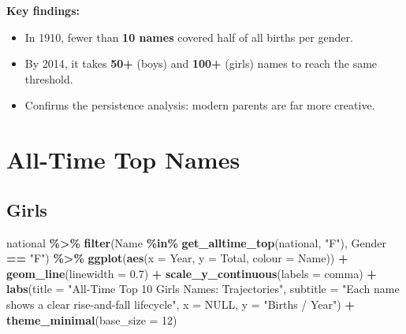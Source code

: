 \documentclass[
]{article}
\newenvironment{Shaded}{\begin{snugshade}}{\end{snugshade}}
\newcommand{\AttributeTok}[1]{\textcolor[rgb]{0.13,0.29,0.53}{#1}}
\newcommand{\ConstantTok}[1]{\textcolor[rgb]{0.56,0.35,0.01}{#1}}
\newcommand{\DecValTok}[1]{\textcolor[rgb]{0.00,0.00,0.81}{#1}}
\newcommand{\FloatTok}[1]{\textcolor[rgb]{0.00,0.00,0.81}{#1}}
\newcommand{\FunctionTok}[1]{\textcolor[rgb]{0.13,0.29,0.53}{\textbf{#1}}}
\newcommand{\NormalTok}[1]{#1}
\newcommand{\SpecialCharTok}[1]{\textcolor[rgb]{0.81,0.36,0.00}{\textbf{#1}}}
\newcommand{\StringTok}[1]{\textcolor[rgb]{0.31,0.60,0.02}{#1}}
\providecommand{\tightlist}{%
  \setlength{\itemsep}{0pt}\setlength{\parskip}{0pt}}
\begin{document}
\textbf{Key findings:}

\begin{itemize}
\tightlist
\item
  In 1910, fewer than \textbf{10 names} covered half of all births per
  gender.
\item
  By 2014, it takes \textbf{50+} (boys) and \textbf{100+} (girls) names
  to reach the same threshold.
\item
  Confirms the persistence analysis: modern parents are far more
  creative.
\end{itemize}

\newpage

\section{All-Time Top Names}\label{all-time-top-names}

\subsection{Girls}\label{girls-1}

\begin{Shaded}
\begin{Highlighting}[]
\NormalTok{national }\SpecialCharTok{\%\textgreater{}\%}
    \FunctionTok{filter}\NormalTok{(Name }\SpecialCharTok{\%in\%} \FunctionTok{get\_alltime\_top}\NormalTok{(national, }\StringTok{"F"}\NormalTok{), Gender }\SpecialCharTok{==} \StringTok{"F"}\NormalTok{) }\SpecialCharTok{\%\textgreater{}\%}
    \FunctionTok{ggplot}\NormalTok{(}\FunctionTok{aes}\NormalTok{(}\AttributeTok{x =}\NormalTok{ Year, }\AttributeTok{y =}\NormalTok{ Total, }\AttributeTok{colour =}\NormalTok{ Name)) }\SpecialCharTok{+}
    \FunctionTok{geom\_line}\NormalTok{(}\AttributeTok{linewidth =} \FloatTok{0.7}\NormalTok{) }\SpecialCharTok{+}
    \FunctionTok{scale\_y\_continuous}\NormalTok{(}\AttributeTok{labels =}\NormalTok{ comma) }\SpecialCharTok{+}
    \FunctionTok{labs}\NormalTok{(}\AttributeTok{title =} \StringTok{"All{-}Time Top 10 Girls\textquotesingle{} Names: Trajectories"}\NormalTok{,}
         \AttributeTok{subtitle =} \StringTok{"Each name shows a clear rise{-}and{-}fall lifecycle"}\NormalTok{,}
         \AttributeTok{x =} \ConstantTok{NULL}\NormalTok{, }\AttributeTok{y =} \StringTok{"Births / Year"}\NormalTok{) }\SpecialCharTok{+}
    \FunctionTok{theme\_minimal}\NormalTok{(}\AttributeTok{base\_size =} \DecValTok{12}\NormalTok{)}
\end{Highlighting}
\end{Shaded}
\end{document}
